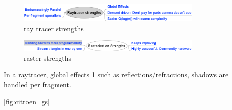 	\begin{figure}[ht]
		\centering \includegraphics[width=0.80\textwidth]{Media/why_hybrid_raymindmap.png}
		\caption{ray tracer strengths}
		\label{fig:ray_mmap}
	\end{figure}
	
	\begin{figure}[ht]
		\centering \includegraphics[width=0.80\textwidth]{Media/why_hybrid_rastermindmap.png}
		\caption{raster strengths}
		\label{fig:raster_mmap}
	\end{figure}

In a raytracer, global effects \ref{fig:ray_mmap} such as reflections/refractions, shadows are handled per fragment.

\ref{fig:citroen_gs}
